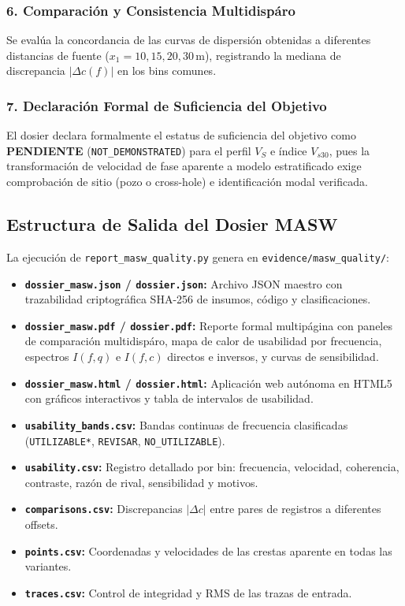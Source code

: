 \documentclass[11pt,a4paper]{article}
\begin{document}
\subsubsection{6. Comparación y Consistencia Multidispáro}
Se evalúa la concordancia de las curvas de dispersión obtenidas a diferentes distancias de fuente ($x_1 = 10, 15, 20, 30$\,m), registrando la mediana de discrepancia $|\Delta c(f)|$ en los bins comunes.

\subsubsection{7. Declaración Formal de Suficiencia del Objetivo}
El dosier declara formalmente el estatus de suficiencia del objetivo como \textbf{PENDIENTE} (\texttt{NOT\_DEMONSTRATED}) para el perfil $V_S$ e índice $V_{s30}$, pues la transformación de velocidad de fase aparente a modelo estratificado exige comprobación de sitio (pozo o cross-hole) e identificación modal verificada.

\subsection{Estructura de Salida del Dosier MASW}
La ejecución de \texttt{report\_masw\_quality.py} genera en \texttt{evidence/masw\_quality/}:
\begin{itemize}
    \item \textbf{\texttt{dossier\_masw.json} / \texttt{dossier.json}:} Archivo JSON maestro con trazabilidad criptográfica SHA-256 de insumos, código y clasificaciones.
    \item \textbf{\texttt{dossier\_masw.pdf} / \texttt{dossier.pdf}:} Reporte formal multipágina con paneles de comparación multidispáro, mapa de calor de usabilidad por frecuencia, espectros $I(f, q)$ e $I(f, c)$ directos e inversos, y curvas de sensibilidad.
    \item \textbf{\texttt{dossier\_masw.html} / \texttt{dossier.html}:} Aplicación web autónoma en HTML5 con gráficos interactivos y tabla de intervalos de usabilidad.
    \item \textbf{\texttt{usability\_bands.csv}:} Bandas continuas de frecuencia clasificadas (\texttt{UTILIZABLE*}, \texttt{REVISAR}, \texttt{NO\_UTILIZABLE}).
    \item \textbf{\texttt{usability.csv}:} Registro detallado por bin: frecuencia, velocidad, coherencia, contraste, razón de rival, sensibilidad y motivos.
    \item \textbf{\texttt{comparisons.csv}:} Discrepancias $|\Delta c|$ entre pares de registros a diferentes offsets.
    \item \textbf{\texttt{points.csv}:} Coordenadas y velocidades de las crestas aparente en todas las variantes.
    \item \textbf{\texttt{traces.csv}:} Control de integridad y RMS de las trazas de entrada.
\end{itemize}
\end{document}
